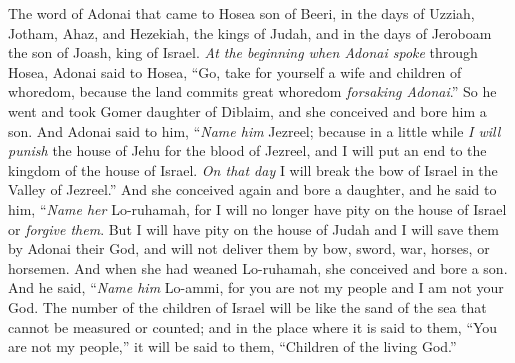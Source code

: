 
\begin{biblechapter} %
 The word of Adonai that came to Hosea son of Beeri, in the days of Uzziah, Jotham, Ahaz, and Hezekiah, the kings of Judah, and in the days of Jeroboam the son of Joash, king of Israel.
\verse \textit{At the beginning when Adonai spoke} through Hosea, 
Adonai said to Hosea, 
“Go, take for yourself a wife and children of whoredom, 
because the land commits great whoredom 
\textit{forsaking Adonai}.”
\verse So he went and took Gomer daughter of Diblaim, 
and she conceived and bore him a son.
\verse And Adonai said to him, 
“\textit{Name him} Jezreel; 
because in a little while \textit{I will punish} the house of Jehu 
for the blood of Jezreel, 
and I will put an end to the kingdom of the house of Israel.
\verse \textit{On that day} 
I will break the bow of Israel 
in the Valley of Jezreel.”
\verse And she conceived again and bore a daughter, and he said to him,
\verse “\textit{Name her} Lo-ruhamah, 
for I will no longer have pity 
on the house of Israel 
or \textit{forgive them}.
\verse But I will have pity on the house of Judah 
and I will save them by Adonai their God, 
and will not deliver them 
by bow, sword, war, 
horses, or horsemen.
\verse And when she had weaned Lo-ruhamah, she conceived and bore a son.
\verse And he said, “\textit{Name him} Lo-ammi, 
for you are not my people 
and I am not your God.
\verse  The number of the children of Israel 
will be like the sand of the sea 
that cannot be measured or counted; 
and in the place where it is said to them, 
“You are not my people,” 
it will be said to them, 
“Children of the living God.”
\end{biblechapter}


